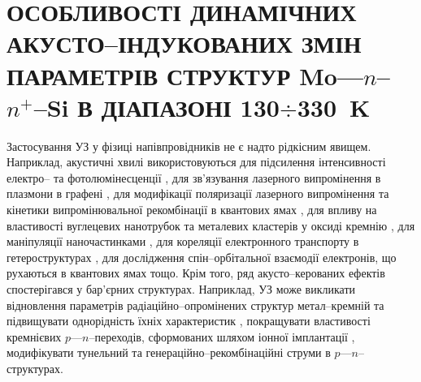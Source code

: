 \chapter{\MakeUppercase{Особливості динамічних акусто--індукованих змін параметрів
 структур} Mo---$n$--$n^+$--Si \MakeUppercase{в діапазоні 130$\div$330~K}\label{Ch_USL_T_SD}}

Застосування УЗ у фізиці напівпровідників не є надто рідкісним явищем.
Наприклад, акустичні хвилі використовуються для підсилення інтенсивності
електро-- \cite{Wang:JLum} та фотолюмінесценції \cite{Bahar2003,ZobovFTP2008},
для зв'язування лазерного випромінення в плазмони в графені \cite{Schiefele:2011},
для модифікації поляризації лазерного випромінення \cite{Kulakova:2012SSC} та
кінетики випромінювальної рекомбінації в квантових ямах \cite{Ostrovskii2001},
для впливу на властивості вуглецевих нанотрубок \cite{Pandey:2014}
та металевих кластерів у оксиді кремнію \cite{Roman:2006JAP,Roman:2007APL},
для маніпуляції наночастинками \cite{Bart:2011},
для кореляції електронного транспорту в гетероструктурах \cite{Buyukkose:2013,He:2010},
для дослідження спін--орбітальної взаємодії електронів, що рухаються в квантових ямах \cite{Sanada:2011} тощо.
Крім того, ряд акусто--керованих ефектів спостерігався у бар'єрних структурах.
Наприклад, УЗ може викликати відновлення параметрів радіаційно--опромінених \cite{Gorb2010} структур метал--кремній та підвищувати
однорідність їхніх характеристик \cite{Olikh:PZTF2006},
покращувати властивості кремнієвих $p$---$n$--переходів, сформованих шляхом іонної імплантації \cite{YOlikh2005},
модифікувати тунельний \cite{Teterkin2009r} та генераційно--рекомбінаційні \cite{Davletova2009,Davletova2008} струми в $p$---$n$--структурах.


